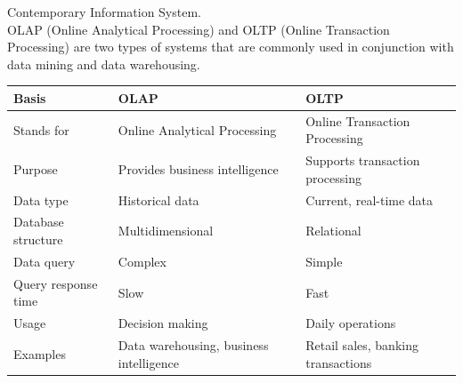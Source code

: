 \documentclass[12pt]{article}
\begin{document}
\begin{enumerate}
{    Contemporary Information System.\\}
    OLAP (Online Analytical Processing) and OLTP (Online Transaction Processing) are two types of systems that are commonly used in conjunction with data mining and data warehousing.
    \begin{longtable}{ |L{3cm}|L{4.5cm}|L{4.5cm}| }
        \hline
        Basis& OLAP & OLTP \\
        \hline
        Stands for & Online Analytical Processing & Online Transaction Processing \\
        \hline
        Purpose & Provides business intelligence & Supports transaction processing \\
        \hline
        Data type & Historical data & Current, real-time data \\
        \hline
        Database structure & Multidimensional & Relational \\
        \hline
        Data query & Complex & Simple \\
        \hline
        Query response time & Slow & Fast \\
        \hline
        Usage & Decision making & Daily operations \\
        \hline
        Examples & Data warehousing, business intelligence & Retail sales, banking transactions \\
        \hline
        \end{longtable}
    

\end{enumerate}
\end{document}
